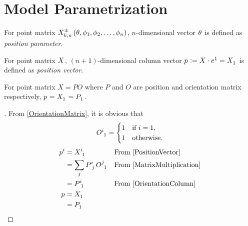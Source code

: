 \documentclass[stu, babel, american, biblatex, a4paper, draftall]{apa7}
\begin{document}
\section{Model Parametrization}
\begin{definition}\label{PositionParameter}
    For point matrix $\tensor{X^\pm_{k,n}\left(\theta,\phi_1,\phi_2,\dots,\phi_n\right)}{}$,
    $n$-dimensional vector $\tensor{\theta}{}$
    is defined as \textit{position parameter}.
\end{definition}
\begin{definition}\label{PositionVector}
    For point matrix $\tensor{X}{}$,
    $\left(n+1\right)$-dimensional column vector $\tensor{p}{}\defeq \tensor{X}{}\cdot\tensor{e}{^1}=\tensor{X}{_1}$
    is defined as \textit{position vector}.
\end{definition}
\begin{lemma}\label{PositionVectorMatrix}
    For point matrix $X=PO$
    where $P$ and $O$ are position and orientation matrix respectively,
    $\tensor{p}{}=\tensor{X}{_1}=\tensor{P}{_1}$.
\end{lemma}
\begin{proof}[]
    From \cref{OrientationMatrix}, it is obvious that
    \begin{equation}\label{OrientationColumn}
        \tensor{O}{^i_1} =
        \begin{cases}
            1 & \text{if $i=1$,}  \\
            1 & \text{otherwise.} \\
        \end{cases}
    \end{equation}
    \begin{align*}
        \tensor{p}{^i}
         & = \tensor{X}{^i_1}                         &  & \text{From \cref{PositionVector}}       \\
         & = \sum_j{\tensor{P}{^i_j}\tensor{O}{^j_1}} &  & \text{From \cref{MatrixMultiplication}} \\
         & = \tensor{P}{^i_1}                         &  & \text{From \cref{OrientationColumn}}    \\
        \tensor{p}{}
         & = \tensor{X}{_1}                                                                        \\
         & = \tensor{P}{_1}                           &  & \qedhere
    \end{align*}
\end{proof}
\end{document}
